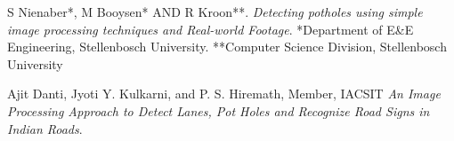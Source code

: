 \documentclass[12pt,a4paper]{article}
\begin{document}
\begin{thebibliography}{9}
S Nienaber*, M Booysen* AND R Kroon**.
\textit{Detecting potholes using simple image processing techniques and Real-world Footage}. 
*Department of E\&E Engineering, Stellenbosch University.
**Computer Science Division, Stellenbosch University
 
Ajit Danti, Jyoti Y. Kulkarni, and P. S. Hiremath, Member, IACSIT
\textit{An Image Processing Approach to Detect Lanes, Pot Holes and Recognize Road Signs in Indian Roads}.

\end{thebibliography}
\end{document}
